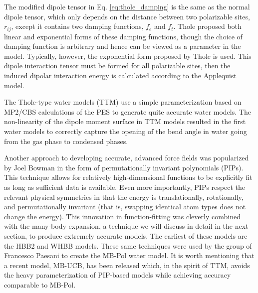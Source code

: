 \documentclass[11pt, proquest]{uwthesis}[2020/02/24]
\let\ce\ch
\begin{document}
The modified dipole tensor in Eq. \ref{eq:thole_damping} is the same as the normal dipole tensor, which only depends on the distance between two polarizable sites, $r_{ij}$, except it contains two damping functions, $f_e$ and $f_t$. Thole proposed both linear and exponential forms of these damping functions, though the choice of damping function is arbitrary and hence can be viewed as a parameter in the model. Typically, however, the exponential form proposed by Thole is used. This dipole interaction tensor must be formed for all polarizable sites, then the induced dipolar interaction energy is calculated according to the Applequist model.\autocite{applequist_atom_1972}

\par The Thole-type water models (TTM) use a simple parameterization based on MP2/CBS calculations of the \ce{(H2O)2} PES to generate quite accurate water models\autocite{burnham_development_2002,burnham_development_2002-1,fanourgakis_flexible_2006,fanourgakis_development_2008}. The non-linearity of the dipole moment surface in TTM models resulted in the first water models to correctly capture the opening of the bend angle in water going from the gas phase to condensed phases\autocite{fanourgakis_bend_2006}.

\par Another approach to developing accurate, advanced force fields was popularized by Joel Bowman in the form of permutationally invariant polynomials (PIPs)\autocite{braams_permutationally_2009}. This technique allows for relatively high-dimensional functions to be explicitly fit as long as sufficient data is available. Even more importantly, PIPs respect the relevant physical symmetries in that the energy is translationally, rotationally, and permutationally invariant (that is, swapping identical atom types does not change the energy). This innovation in function-fitting was cleverly combined with the many-body expansion, a technique we will discuss in detail in the next section, to produce extremely accurate models. The earliest of these models are the HBB2\autocite{huang_ab_2006} and WHBB\autocite{wang_full-dimensional_2009} models. These same techniques were used by the group of Francesco Paesani to create the MB-Pol water model\autocite{babin_toward_2012, babin_development_2013, babin_development_2013-1, babin_development_2014}. It is worth mentioning that a recent model, MB-UCB\autocite{das_development_2019}, has been released which, in the spirit of TTM, avoids the heavy parameterization of PIP-based models while achieving accuracy comparable to MB-Pol.
\end{document}
